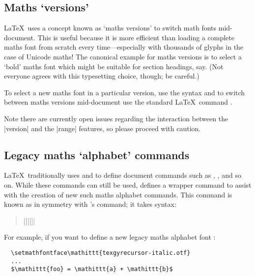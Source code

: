 \subsection{Maths `versions'}

\LaTeX\ uses a concept known as `maths versions' to switch math fonts
mid-document.
This is useful because it is more efficient than loading a complete maths
font from scratch every time---especially with thousands of glyphs in the case of Unicode maths!
The canonical example for maths versions is to select a `bold' maths font
which might be suitable for section headings, say.
(Not everyone agrees with this typesetting choice, though; be careful.)

To select a new maths font in a particular version, use the syntax
and to switch between maths versions mid-document use the standard \LaTeX\ command
\cmd\mathversion{}.

Note there are currently open issues regarding the interaction between the |version|
and the |range| features, so please proceed with caution.

\subsection{Legacy maths `alphabet' commands}

\LaTeX\ traditionally uses  and  to define document commands such as , , and so on.
While these commands can still be used,  defines a wrapper command to assist with the creation of new such maths alphabet commands.
This command is known as  in symmetry with 's  command; it takes syntax:
\begin{quote}
  \cmd\setmathfontface{}|[||]|

\end{quote}
For example, if you want to define a new legacy maths alphabet font :
\begin{verbatim}
  \setmathfontface\mathittt{texgyrecursor-italic.otf}
  ...
  $\mathittt{foo} = \mathittt{a} + \mathittt{b}$
\end{verbatim}


